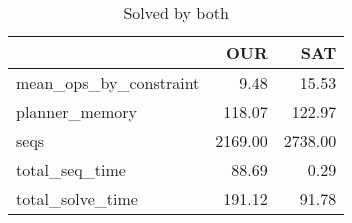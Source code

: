 \begin{table}[htbp]
\centering
\begingroup\small
\begin{tabular}{lrr}
  \hline
 & OUR & SAT \\ 
  \hline
mean\_ops\_by\_constraint & 9.48 & 15.53 \\ 
  planner\_memory & 118.07 & 122.97 \\ 
  seqs & 2169.00 & 2738.00 \\ 
  total\_seq\_time & 88.69 & 0.29 \\ 
  total\_solve\_time & 191.12 & 91.78 \\ 
   \hline
\end{tabular}
\endgroup
\caption{Solved by both} 
\label{tab:summary_both}
\end{table}
